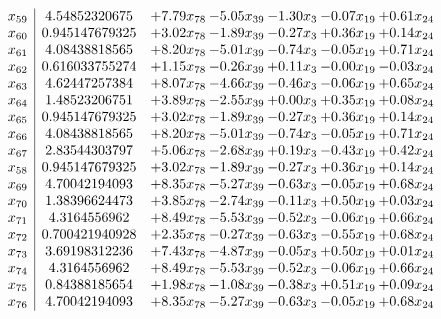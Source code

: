 \documentclass[8pt]{article}
\begin{document}
\[\begin{array}{c| c c@{\hskip 2pt} c@{\hskip 2pt} c@{\hskip 2pt} c@{\hskip 2pt} c@{\hskip 2pt} }
 x_{59}   &  4.54852320675 & +  7.79 x_{78} & -5.05 x_{39} & -1.30 x_{3} & -0.07 x_{19} & +  0.61 x_{24}\\
 x_{60}   &  0.945147679325 & +  3.02 x_{78} & -1.89 x_{39} & -0.27 x_{3} & +  0.36 x_{19} & +  0.14 x_{24}\\
 x_{61}   &  4.08438818565 & +  8.20 x_{78} & -5.01 x_{39} & -0.74 x_{3} & -0.05 x_{19} & +  0.71 x_{24}\\
 x_{62}   &  0.616033755274 & +  1.15 x_{78} & -0.26 x_{39} & +  0.11 x_{3} & -0.00 x_{19} & -0.03 x_{24}\\
 x_{63}   &  4.62447257384 & +  8.07 x_{78} & -4.66 x_{39} & -0.46 x_{3} & -0.06 x_{19} & +  0.65 x_{24}\\
 x_{64}   &  1.48523206751 & +  3.89 x_{78} & -2.55 x_{39} & +  0.00 x_{3} & +  0.35 x_{19} & +  0.08 x_{24}\\
 x_{65}   &  0.945147679325 & +  3.02 x_{78} & -1.89 x_{39} & -0.27 x_{3} & +  0.36 x_{19} & +  0.14 x_{24}\\
 x_{66}   &  4.08438818565 & +  8.20 x_{78} & -5.01 x_{39} & -0.74 x_{3} & -0.05 x_{19} & +  0.71 x_{24}\\
 x_{67}   &  2.83544303797 & +  5.06 x_{78} & -2.68 x_{39} & +  0.19 x_{3} & -0.43 x_{19} & +  0.42 x_{24}\\
 x_{58}   &  0.945147679325 & +  3.02 x_{78} & -1.89 x_{39} & -0.27 x_{3} & +  0.36 x_{19} & +  0.14 x_{24}\\
 x_{69}   &  4.70042194093 & +  8.35 x_{78} & -5.27 x_{39} & -0.63 x_{3} & -0.05 x_{19} & +  0.68 x_{24}\\
 x_{70}   &  1.38396624473 & +  3.85 x_{78} & -2.74 x_{39} & -0.11 x_{3} & +  0.50 x_{19} & +  0.03 x_{24}\\
 x_{71}   &  4.3164556962 & +  8.49 x_{78} & -5.53 x_{39} & -0.52 x_{3} & -0.06 x_{19} & +  0.66 x_{24}\\
 x_{72}   &  0.700421940928 & +  2.35 x_{78} & -0.27 x_{39} & -0.63 x_{3} & -0.55 x_{19} & +  0.68 x_{24}\\
 x_{73}   &  3.69198312236 & +  7.43 x_{78} & -4.87 x_{39} & -0.05 x_{3} & +  0.50 x_{19} & +  0.01 x_{24}\\
 x_{74}   &  4.3164556962 & +  8.49 x_{78} & -5.53 x_{39} & -0.52 x_{3} & -0.06 x_{19} & +  0.66 x_{24}\\
 x_{75}   &  0.84388185654 & +  1.98 x_{78} & -1.08 x_{39} & -0.38 x_{3} & +  0.51 x_{19} & +  0.09 x_{24}\\
 x_{76}   &  4.70042194093 & +  8.35 x_{78} & -5.27 x_{39} & -0.63 x_{3} & -0.05 x_{19} & +  0.68 x_{24}\\

\end{array}\]
\end{document}
